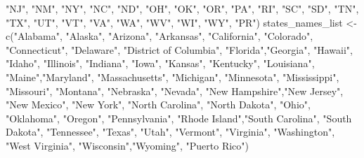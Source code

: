 \documentclass[
  11 pt,
  openany]{book}
\newenvironment{Shaded}{\begin{snugshade}}{\end{snugshade}}
\newcommand{\FunctionTok}[1]{\textcolor[rgb]{0.00,0.00,0.00}{#1}}
\newcommand{\NormalTok}[1]{#1}
\newcommand{\OtherTok}[1]{\textcolor[rgb]{0.56,0.35,0.01}{#1}}
\newcommand{\StringTok}[1]{\textcolor[rgb]{0.31,0.60,0.02}{#1}}
\begin{document}
\begin{Shaded}
\begin{Highlighting}[]
    \StringTok{"NJ"}\NormalTok{, }\StringTok{"NM"}\NormalTok{, }\StringTok{"NY"}\NormalTok{, }\StringTok{"NC"}\NormalTok{, }\StringTok{"ND"}\NormalTok{, }\StringTok{"OH"}\NormalTok{, }\StringTok{"OK"}\NormalTok{, }\StringTok{"OR"}\NormalTok{, }\StringTok{"PA"}\NormalTok{, }\StringTok{"RI"}\NormalTok{,}
    \StringTok{"SC"}\NormalTok{, }\StringTok{"SD"}\NormalTok{, }\StringTok{"TN"}\NormalTok{, }\StringTok{"TX"}\NormalTok{, }\StringTok{"UT"}\NormalTok{, }\StringTok{"VT"}\NormalTok{, }\StringTok{"VA"}\NormalTok{, }\StringTok{"WA"}\NormalTok{, }\StringTok{"WV"}\NormalTok{, }\StringTok{"WI"}\NormalTok{,}
    \StringTok{"WY"}\NormalTok{, }\StringTok{"PR"}\NormalTok{)}
\NormalTok{states\_names\_list }\OtherTok{\textless{}{-}} 
  \FunctionTok{c}\NormalTok{(}\StringTok{"Alabama"}\NormalTok{, }\StringTok{"Alaska"}\NormalTok{, }\StringTok{"Arizona"}\NormalTok{, }\StringTok{"Arkansas"}\NormalTok{, }\StringTok{"California"}\NormalTok{, }
    \StringTok{"Colorado"}\NormalTok{, }\StringTok{"Connecticut"}\NormalTok{, }\StringTok{"Delaware"}\NormalTok{, }\StringTok{"District of Columbia"}\NormalTok{, }
    \StringTok{"Florida"}\NormalTok{,}\StringTok{"Georgia"}\NormalTok{, }\StringTok{"Hawaii"}\NormalTok{, }\StringTok{"Idaho"}\NormalTok{, }\StringTok{"Illinois"}\NormalTok{, }\StringTok{"Indiana"}\NormalTok{, }
    \StringTok{"Iowa"}\NormalTok{, }\StringTok{"Kansas"}\NormalTok{, }\StringTok{"Kentucky"}\NormalTok{, }\StringTok{"Louisiana"}\NormalTok{, }\StringTok{"Maine"}\NormalTok{,}\StringTok{"Maryland"}\NormalTok{, }
    \StringTok{"Massachusetts"}\NormalTok{, }\StringTok{"Michigan"}\NormalTok{, }\StringTok{"Minnesota"}\NormalTok{, }\StringTok{"Mississippi"}\NormalTok{, }\StringTok{"Missouri"}\NormalTok{, }
    \StringTok{"Montana"}\NormalTok{, }\StringTok{"Nebraska"}\NormalTok{, }\StringTok{"Nevada"}\NormalTok{, }\StringTok{"New Hampshire"}\NormalTok{,}\StringTok{"New Jersey"}\NormalTok{, }
    \StringTok{"New Mexico"}\NormalTok{, }\StringTok{"New York"}\NormalTok{, }\StringTok{"North Carolina"}\NormalTok{, }\StringTok{"North Dakota"}\NormalTok{, }\StringTok{"Ohio"}\NormalTok{, }
    \StringTok{"Oklahoma"}\NormalTok{, }\StringTok{"Oregon"}\NormalTok{, }\StringTok{"Pennsylvania"}\NormalTok{, }\StringTok{"Rhode Island"}\NormalTok{,}\StringTok{"South Carolina"}\NormalTok{, }
    \StringTok{"South Dakota"}\NormalTok{, }\StringTok{"Tennessee"}\NormalTok{, }\StringTok{"Texas"}\NormalTok{, }\StringTok{"Utah"}\NormalTok{, }\StringTok{"Vermont"}\NormalTok{, }\StringTok{"Virginia"}\NormalTok{, }
    \StringTok{"Washington"}\NormalTok{, }\StringTok{"West Virginia"}\NormalTok{, }\StringTok{"Wisconsin"}\NormalTok{,}\StringTok{"Wyoming"}\NormalTok{, }\StringTok{"Puerto Rico"}\NormalTok{)}


\end{Highlighting}
\end{Shaded}
\end{document}
